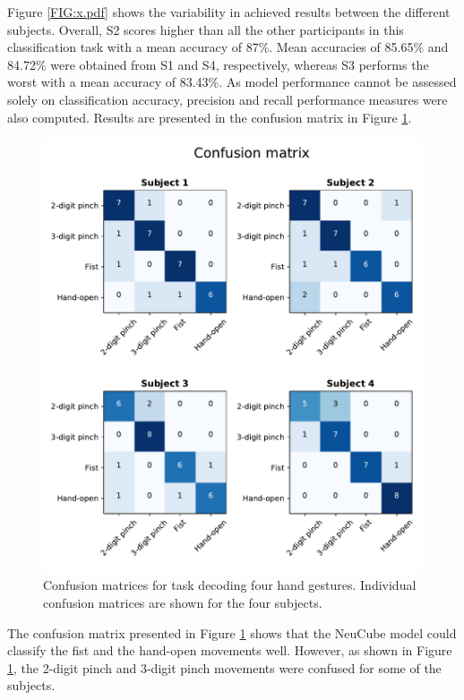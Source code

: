 \documentclass[journal,article,submit,moreauthors,pdftex,10pt,a4paper]{Definitions/mdpi}
\begin{document}
Figure \ref{FIG:x.pdf} shows the variability in achieved results between the different subjects. Overall, S2 scores higher than all the other participants in this classification task with a mean accuracy of 87\%. Mean accuracies of 85.65\% and 84.72\% were obtained from S1 and S4, respectively, whereas S3 performs the worst with a mean accuracy of 83.43\%. As model performance cannot be assessed solely on classification accuracy, precision and recall performance measures were also computed. Results are presented in the confusion matrix in Figure \ref{FIG:confusion_matrix.pdf}. 
\begin{figure}[ht]
    \centering
    \includegraphics [width=0.6\linewidth]{confusion_matrix.pdf}
    \caption{Confusion matrices for task decoding four hand gestures. Individual confusion matrices are shown for the four subjects. 
}
    \label{FIG:confusion_matrix.pdf}
\end{figure}
The confusion matrix presented in  Figure \ref{FIG:confusion_matrix.pdf} shows that the NeuCube model could classify the fist and the hand-open movements well. However, as shown in Figure \ref{FIG:confusion_matrix.pdf}, the 2-digit pinch and 3-digit pinch movements were confused for some of the subjects.  
\end{document}
